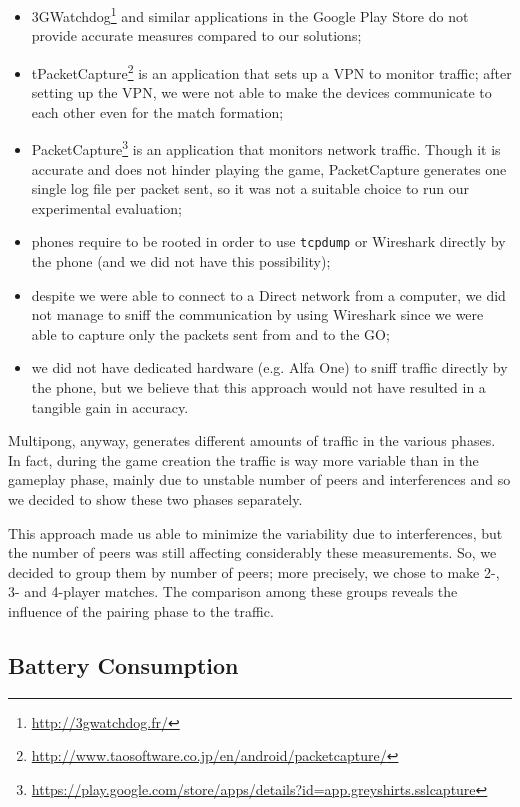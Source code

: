 \begin{itemize}
  \item 3GWatchdog\footnote{\url{http://3gwatchdog.fr/}} and similar
    applications in the Google Play Store do not provide accurate measures
    compared to our solutions;
  \item tPacketCapture\footnote{\url{http://www.taosoftware.co.jp/en/android/packetcapture/}}
    is an application that sets up a VPN to monitor traffic; after setting up
    the VPN, we were not able to make the devices communicate to each other
    even for the match formation;
  \item PacketCapture\footnote{\url{https://play.google.com/store/apps/details?id=app.greyshirts.sslcapture}}
    is an application that monitors network traffic. Though it is accurate and
    does not hinder playing the game, PacketCapture generates one single log
    file per packet sent, so it was not a suitable choice to run our
    experimental evaluation;
  \item phones require to be rooted in order to use \texttt{tcpdump} or
    Wireshark directly by the phone (and we did not have this possibility);
  \item despite we were able to connect to a \wifi{} Direct network from a
    computer, we did not manage to sniff the communication by using Wireshark
    since we were able to capture only the packets sent from and to the GO;
  \item we did not have dedicated hardware (e.g. Alfa One) to sniff traffic
    directly by the phone, but we believe that this approach would not have
    resulted in a tangible gain in accuracy.
\end{itemize}

Multipong, anyway, generates different amounts of traffic in the various
phases. In fact, during the game creation the traffic is way more variable than
in the gameplay phase, mainly due to unstable number of peers and \wifi{}
interferences and so we decided to show these two phases separately.

This approach made us able to minimize the variability due to interferences, but the number of peers was still affecting considerably these measurements. So, we decided to group them by number of peers; more precisely, we chose to make 2-, 3- and 4-player matches. The comparison among these groups reveals the influence of the pairing phase to the traffic.

\subsection{Battery Consumption}

